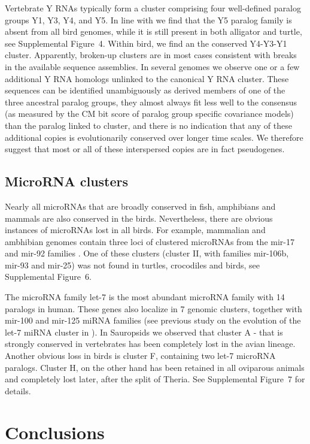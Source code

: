 \documentclass[10pt]{bmc_article}
\newenvironment{bmcformat}{\begin{raggedright}\baselineskip20pt\sloppy\setboolean{publ}{false}}{\end{raggedright}\baselineskip20pt\sloppy}
\begin{document}
\begin{bmcformat}
Vertebrate Y RNAs typically form a cluster comprising four
well-defined paralog groups Y1, Y3, Y4, and Y5. In line with
\cite{Mosig:07a} we find that the Y5 paralog family is absent from all
bird genomes, while it is still present in both alligator and turtle,
see Supplemental Figure~4. Within bird, we find an the conserved
Y4-Y3-Y1 cluster. Apparently, broken-up clusters are in most cases
consistent with breaks in the available sequence assemblies. In
several genomes we observe one or a few additional Y RNA homologs
unlinked to the canonical Y RNA cluster. These sequences can be
identified unambiguously as derived members of one of the three
ancestral paralog groups, they almost always fit less well to the
consensus (as measured by the CM bit score of paralog group specific
covariance models) than the paralog linked to cluster, and there is no
indication that any of these additional copies is evolutionarily
conserved over longer time scales. We therefore suggest that most or
all of these interspersed copies are in fact pseudogenes.

\subsection*{MicroRNA clusters} 

Nearly all microRNAs that are broadly conserved in fish, amphibians and
mammals are also conserved in the birds. Nevertheless, there are obvious
instances of microRNAs lost in all birds. For example, mammalian and
ambhibian genomes contain three loci of clustered microRNAs from the mir-17
and mir-92 families \cite{Tanzer:04}. One of these clusters (cluster II,
with families mir-106b, mir-93 and mir-25) was not found in turtles,
crocodiles and birds, see Supplemental Figure~6.

The microRNA family let-7 is the most abundant microRNA family with 14
paralogs in human. These genes also localize in 7 genomic clusters,
together with mir-100 and mir-125 miRNA families (see previous study on the
evolution of the let-7 miRNA cluster in \cite{Hertel:2012}). In Sauropsids
we observed that cluster A - that is strongly conserved in vertebrates has
been completely lost in the avian lineage. Another obvious loss in birds is
cluster F, containing two let-7 microRNA paralogs. Cluster H, on the other
hand has been retained in all oviparous animals and completely lost later,
after the split of Theria. See Supplemental Figure~7 for details.



\section*{Conclusions}


\end{bmcformat}
\end{document}
